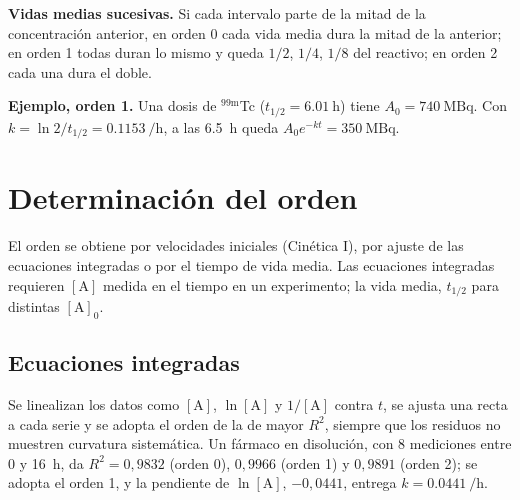 \documentclass[10pt,letterpaper]{article}
\begin{document}
\vspace{4pt}
\begin{minipage}[t]{0.50\linewidth}\vspace{0pt}
\end{minipage}\hfill
\begin{minipage}[t]{0.46\linewidth}\vspace{4pt}\small\raggedright
\textbf{Vidas medias sucesivas.} Si cada intervalo parte de la mitad de la concentración anterior, en orden 0 cada vida media dura la mitad de la anterior; en orden 1 todas duran lo mismo y queda $1/2$, $1/4$, $1/8$ del reactivo; en orden 2 cada una dura el doble.
\vspace{8pt}

\textbf{Ejemplo, orden 1.} Una dosis de $^{99\mathrm{m}}$Tc ($t_{1/2}=\SI{6,01}{\hour}$) tiene $A_0=\SI{740}{\mega\becquerel}$. Con $k=\ln 2/t_{1/2}=\SI{0,1153}{\per\hour}$, a las \SI{6,5}{\hour} queda $A_0e^{-kt}=\SI{350}{\mega\becquerel}$.
\end{minipage}

\section{Determinación del orden}
El orden se obtiene por velocidades iniciales (Cinética I), por ajuste de las ecuaciones integradas o por el tiempo de vida media. Las ecuaciones integradas requieren $[\mathrm{A}]$ medida en el tiempo en un experimento; la vida media, $t_{1/2}$ para distintas $[\mathrm{A}]_0$.

\subsection*{Ecuaciones integradas}
Se linealizan los datos como $[\mathrm{A}]$, $\ln[\mathrm{A}]$ y $1/[\mathrm{A}]$ contra $t$, se ajusta una recta a cada serie y se adopta el orden de la de mayor $R^{2}$, siempre que los residuos no muestren curvatura sistemática. Un fármaco en disolución, con 8 mediciones entre 0 y \SI{16}{\hour}, da $R^{2}=0{,}9832$ (orden 0), $0{,}9966$ (orden 1) y $0{,}9891$ (orden 2); se adopta el orden 1, y la pendiente de $\ln[\mathrm{A}]$, $-0{,}0441$, entrega $k=\SI{0,0441}{\per\hour}$.
\end{document}
